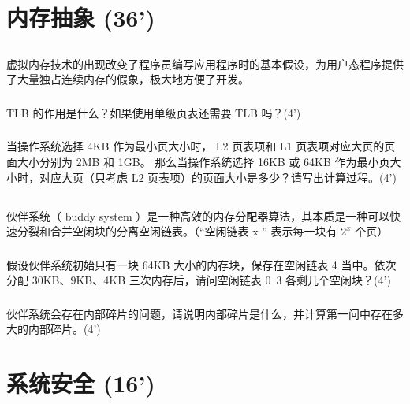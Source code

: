 \documentclass[a4paper,12pt]{article}
\begin{document}
\section{内存抽象 (36')}

\subsection{}

虚拟内存技术的出现改变了程序员编写应用程序时的基本假设，为用户态程序提供了大量独占连续内存的假象，极大地方便了开发。

\subsubsection{}

TLB 的作用是什么？如果使用单级页表还需要 TLB 吗？(4')

\subsubsection{}

当操作系统选择 4KB 作为最小页大小时， L2 页表项和 L1 页表项对应大页的页面大小分别为 2MB 和 1GB。
那么当操作系统选择 16KB 或 64KB 作为最小页大小时，对应大页（只考虑 L2 页表项）的页面大小是多少？请写出计算过程。(4')


\subsection{}

伙伴系统（ buddy system ）是一种高效的内存分配器算法，其本质是一种可以快速分裂和合并空闲块的分离空闲链表。（“空闲链表 x ” 表示每一块有 $2^{x}$ 个页）

\subsubsection{}

假设伙伴系统初始只有一块 64KB 大小的内存块，保存在空闲链表 4 当中。依次分配 30KB、9KB、4KB 三次内存后，请问空闲链表 0~3 各剩几个空闲块？(4')

\subsubsection{}

伙伴系统会存在内部碎片的问题，请说明内部碎片是什么，并计算第一问中存在多大的内部碎片。(4')

\section{系统安全 (16')}
\end{document}
